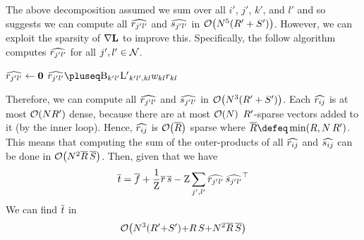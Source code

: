 \documentclass[11pt,a4paper]{article}
\theoremstyle{definition}
\begin{document}
The above decomposition assumed we sum over all $i'$, $j'$, $k'$, and $l'$ and so suggests we can compute all ${\widehat{r_{j'l'}}}$ and ${\widehat{s_{j'l'}}}$ in $\mathcal{O}\!\left({N}^5({R'} + {S'})\right)$.
However, we can exploit the sparsity of $\nabla{\mathbf{L}}$ to improve this.
Specifically, the follow algorithm computes ${\widehat{r_{j'l'}}}$ for all $j',l'\in{\mathcal{N}}$.
\begin{algorithmic}
\State ${\widehat{r_{j'l'}}} \gets \boldsymbol{0}$
  
  
  \Comment{$\bigo{\nN}$}
    \State $\rhat{j'l'} \pluseq
    \cachedelem{k'l'}\dlap{k'l'}{kl}\wedge{kl}\redge{kl}$
\EndFor
\EndFor
\EndFor
\end{algorithmic}
Therefore, we can compute all ${\widehat{r_{j'l'}}}$ and ${\widehat{s_{j'l'}}}$ in $\mathcal{O}\!\left({N}^3({R'} + {S'})\right)$.
Each ${\widehat{r_{ij}}}$ is at most $\mathcal{O}\!\left({N}{R'}\right)$ dense, 
because there are at most $\bigo{\nN}$ ${R'}$-sparse vectors added to it (by the inner loop).
Hence, ${\widehat{r_{ij}}}$ is $\mathcal{O}\!\left(\overline{{R}}\right)$ sparse where $\bar{\nR} {\defeq} \min(\nR, \nN\,\nRs)$.
This means that computing the sum of the outer-products of all ${\widehat{r_{ij}}}$ and ${\widehat{s_{ij}}}$ can be done in
$\mathcal{O}\!\left({N}^2\overline{{R}}\,\overline{{S}}\right)$.
Then, given that we have
\begin{equation*}
{\overline{t}} = {\overline{f}} + \frac{1}{{\mathrm{Z}}}{\overline{r}}\,{\overline{s}} - {\mathrm{Z}}\sum_{j',l'}{\widehat{r_{j'l'}}}\,{\widehat{s_{j'l'}}}^{\top}
\end{equation*}
We can find ${\overline{t}}$ in 
$$\mathcal{O}\big({N}^3({R'}{+}{S'}){+}{R}\,{S}{+}{N}^2\overline{{R}}\,\overline{{S}}\big)$$
\end{document}
